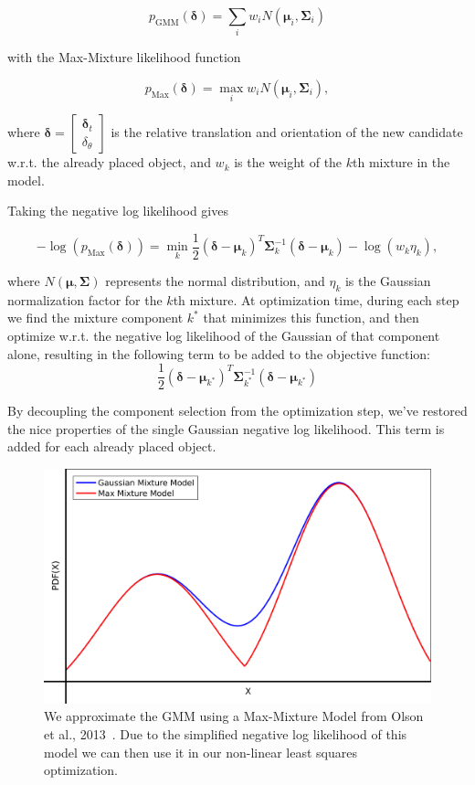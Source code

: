 \documentclass[10pt,twocolumn,letterpaper]{article}
\newcommand{\bb}[1]{{\bm{#1}}}
\begin{document}
\[ p_\mathrm{GMM}(\bb{\delta}) = \sum_i w_i N(\bb{\mu}_i, \bb{\Sigma}_i) \]

with the Max-Mixture likelihood function

\[ p_\mathrm{Max}(\bb{\delta}) = \max_i w_i N(\bb{\mu}_i, \bb{\Sigma}_i), \]

where $\bb{\delta} = \begin{bmatrix} \bb{\delta}_t \\ \delta_\theta
\end{bmatrix}$ is the relative translation and orientation of the new candidate
w.r.t. the already placed object, and $w_k$ is the weight of the $k$th mixture in
the model.

Taking the negative log likelihood gives 

\[ -\log(p_\mathrm{Max}(\bb{\delta})) = \min_k \frac{1}{2} (\bb{\delta} - \bb{\mu}_k)^T \bb{\Sigma}_k^{-1}(\bb{\delta} - \bb{\mu}_k) - \log(w_k\eta_k), \]

where $N(\bb{\mu}, \bb{\Sigma})$ represents the normal distribution, and $\eta_k$ is the Gaussian normalization factor for the $k$th mixture. At
optimization time, during each step we find the mixture component $k^*$ that
minimizes this function, and then optimize w.r.t. the negative log likelihood
of the Gaussian of that component alone, resulting in the following term to be added to the objective function:
\[ \frac{1}{2} (\bb{\delta} - \bb{\mu}_{k^*})^T \bb{\Sigma}_{k^*}^{-1}(\bb{\delta} - \bb{\mu}_{k^*}) \]

By decoupling the component selection from the optimization step, we've
restored the nice properties of the single Gaussian negative log likelihood.
This term is added for each already placed object.

\begin{figure}
    \includegraphics[width=\linewidth]{figures/max_mixture/max_mixture}
    \caption[Max mixture model]{We approximate the GMM using a Max-Mixture Model from Olson et al., 2013~\cite{Olson:2013:IJRR}. Due to the simplified negative log likelihood of this model we can then use it in our non-linear least squares optimization.}
    \label{fig:ch4:max_mixture}
\end{figure}
\end{document}
